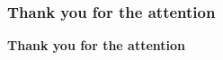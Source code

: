 \documentclass[]{beamer}
\begin{document}
	{
    \begin{frame}
        \frametitle{Thank you for the attention}
        \begin{center}
        	\vskip 2cm
            \textbf{Thank you for the attention}
        \end{center}
    \end{frame}
    }
\end{document}
